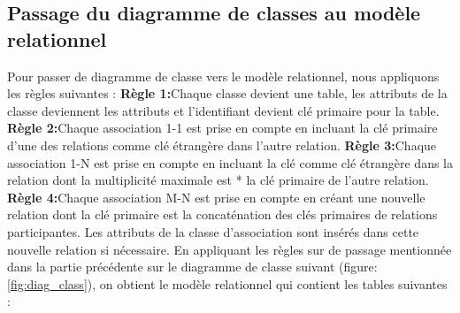 \documentclass[edit,12pt,a4paper,ChapStyle,oneside,doubleinterligne]{report}
\begin{document}
\subsection{Passage du diagramme de classes au modèle relationnel }
Pour passer de diagramme de classe vers le modèle relationnel, nous appliquons les règles suivantes :
\newline
\textbf{Règle 1:}Chaque classe devient une table, les attributs de la classe deviennent
les attributs et l’identifiant devient clé primaire pour la table.
\newline
\textbf{Règle 2:}Chaque association 1-1 est prise en compte en incluant la clé primaire
d’une des relations comme clé étrangère dans l’autre relation.
\newline
\textbf{Règle 3:}Chaque association 1-N est prise en compte en incluant la clé comme
clé étrangère dans la relation dont la multiplicité maximale est * la clé primaire
de l’autre relation.
\newline
\textbf{Règle 4:}Chaque association M-N est prise en compte en créant une nouvelle
relation dont la clé primaire est la concaténation des clés primaires de relations
participantes. Les attributs de la classe d’association sont insérés dans cette nouvelle relation si nécessaire.
\newline \phantom{hassane} \newline
En appliquant les règles sur de passage mentionnée dans la partie précédente sur le diagramme de classe suivant (figure: \ref{fig:diag_class}), on obtient le modèle relationnel qui contient les tables suivantes :
\end{document}
